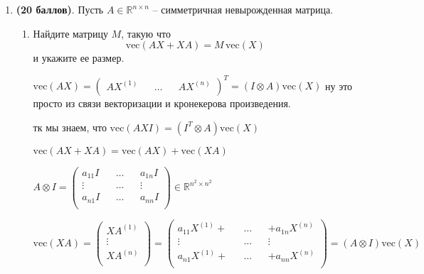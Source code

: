 \documentclass[a4paper, 11pt]{article}
\newcommand{\RR}{\mathbb{R}}
\newcommand{\prob}[1]{\item \textbf{(#1 баллов)}.}
\begin{document}
\begin{enumerate}
\begin{enumerate}
			$= tr(df(X)[H]g(X) + dg(X)[H]f(X)) $ диф произведения 
			
			$= tr((H^T AX + X^T AH)g(X) - (X^T AX) (X^T X)^{-1} ((H^T X + X^T H)  (X^T X)^{-1})) = $
			
			$X^T X = I$ тк ОНБ
			
			$= tr((H^T A^T X + X^T AH)) - tr(X^T AXH^T X + X^T AXX^T H) = 2tr(X^T AH)  - tr(X^T AX H^T X) - tr(X^T AXX^TH) = 2tr(X^T AH) - tr(X^T A^T XX^T H) - tr(X^T AXX^T H) = 2tr(X^T A(I - XX^T)H)$
			
			тогда ответ $2(I - XX^T) A^TX$
		
	\end{enumerate}
	\prob{20}
	Пусть $A\in\mathbb{R}^{n\times n}$ -- симметричная невырожденная матрица.
	\begin{enumerate}
		\item Найдите матрицу $M$, такую что \[\mathrm{vec}(AX + XA) = M\,\mathrm{vec}(X)\] и укажите ее размер.
		
			$\mathrm{vec}(AX) =\begin{pmatrix}
				AX^{(1)} && \dots && AX^{(n)} \\
			\end{pmatrix}^T = (I \otimes A) \mathrm{vec}(X)$ ну это просто из связи векторизации и кронекерова произведения. 
		
			тк мы знаем, что $\mathrm{vec}(AXI) = (I^T \otimes A) \mathrm{vec}(X)$
			
			$\mathrm{vec}(AX + XA) = \mathrm{vec}(AX) + \mathrm{vec}(XA)$
			
			$A \otimes I = \begin{pmatrix}
				a_{11} I && \dots && a_{1n}I \\
				\vdots && \dots && \vdots \\
				a_{n1} I && \dots && a_{nn} I\\ 
			\end{pmatrix} \in \RR^{n^2 \times n^2}$
		
			$\mathrm{vec}(XA) = \begin{pmatrix}
				XA^{(1)} \\
				\vdots \\
				XA^{(n)} \\
			\end{pmatrix} = \begin{pmatrix}
			a_{11}X^{(1)} + && \dots && + a_{1n} X^{(n)} \\
			\vdots && \dots && \vdots \\
			a_{n1}X^{(1)}  + &&  \dots &&  + a_{nn}X^{(n)} \\
			\end{pmatrix} = (A \otimes I) \mathrm{vec}(X)$
	

\end{enumerate}
\end{enumerate}
\end{document}
